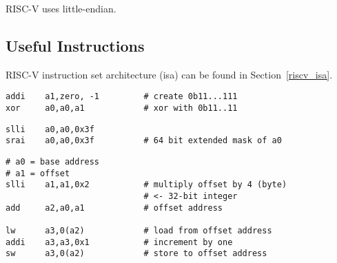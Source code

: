 RISC-V uses little-endian.

\subsection{Useful Instructions}
RISC-V instruction set architecture (isa)  can be found in Section\ \ref{riscv_isa}.

\newpar{}

\begin{lstlisting}[language={[RISC-V]Assembler}]
addi    a1,zero, -1         # create 0b11...111
xor     a0,a0,a1            # xor with 0b11..11
\end{lstlisting}

\newpar{}

\begin{lstlisting}[language={[RISC-V]Assembler}]
slli    a0,a0,0x3f      
srai    a0,a0,0x3f          # 64 bit extended mask of a0
\end{lstlisting}

\newpar{}

\begin{lstlisting}[language={[RISC-V]Assembler}]
# a0 = base address
# a1 = offset
slli    a1,a1,0x2           # multiply offset by 4 (byte) 
                            # <- 32-bit integer
add     a2,a0,a1            # offset address

lw      a3,0(a2)            # load from offset address
addi    a3,a3,0x1           # increment by one
sw      a3,0(a2)            # store to offset address
\end{lstlisting}
